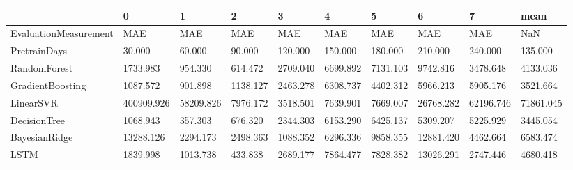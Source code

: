 \begin{tabular}{llllllllll}
\toprule
{} &          0 &         1 &        2 &        3 &        4 &        5 &         6 &         7 &      mean \\
\midrule
EvaluationMeasurement &        MAE &       MAE &      MAE &      MAE &      MAE &      MAE &       MAE &       MAE &       NaN \\
PretrainDays          &     30.000 &    60.000 &   90.000 &  120.000 &  150.000 &  180.000 &   210.000 &   240.000 &   135.000 \\
RandomForest          &   1733.983 &   954.330 &  614.472 & 2709.040 & 6699.892 & 7131.103 &  9742.816 &  3478.648 &  4133.036 \\
GradientBoosting      &   1087.572 &   901.898 & 1138.127 & 2463.278 & 6308.737 & 4402.312 &  5966.213 &  5905.176 &  3521.664 \\
LinearSVR             & 400909.926 & 58209.826 & 7976.172 & 3518.501 & 7639.901 & 7669.007 & 26768.282 & 62196.746 & 71861.045 \\
DecisionTree          &   1068.943 &   357.303 &  676.320 & 2344.303 & 6153.290 & 6425.137 &  5309.207 &  5225.929 &  3445.054 \\
BayesianRidge         &  13288.126 &  2294.173 & 2498.363 & 1088.352 & 6296.336 & 9858.355 & 12881.420 &  4462.664 &  6583.474 \\
LSTM                  &   1839.998 &  1013.738 &  433.838 & 2689.177 & 7864.477 & 7828.382 & 13026.291 &  2747.446 &  4680.418 \\
\bottomrule
\end{tabular}
